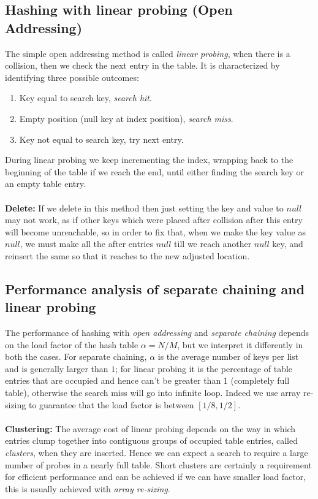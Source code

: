 \documentclass[10pt,a4paper,draft]{article}
\begin{document}
\subsection{Hashing with linear probing (Open Addressing)}
The simple open addressing method is called \emph{linear probing}, when there is a collision, then we check the next entry in the table. It is characterized by identifying three possible outcomes:
\begin{enumerate}
\item Key equal to search key, \emph{search hit}.
\item Empty position (null key at index position), \emph{search miss}.
\item Key not equal to search key, try next entry.
\end{enumerate}
During linear probing we keep incrementing the index, wrapping back to the beginning of the table if we reach the end, until either finding the search key or an empty table entry. 
\\
\\
\textbf{Delete:} If we delete in this method then just setting the key and value to $null$ may not work, as if other keys which were placed after collision after this entry will become unreachable, so in order to fix that, when we make the key value as $null$, we must make all the after entries $null$ till we reach another $null$ key, and reinsert the same so that it reaches to the new adjusted location.
\subsection{Performance analysis of separate chaining and linear probing}
The performance of hashing with \emph{open addressing} and \emph{separate chaining} depends on the load factor of the hash table $\alpha = N/M$, but we interpret it differently in both the cases. For separate chaining, $\alpha$ is the average number of keys per list and is generally larger than $1$; for linear probing it is the percentage of table entries that are occupied and hence can't be greater than $1$ (completely full table), otherwise the search miss will go into infinite loop. Indeed we use array re-sizing to guarantee that the load factor is between $[1/8,1/2]$.
\\
\\
\textbf{Clustering:} The average cost of linear probing depends on the way in which entries clump together into contiguous groups of occupied table entries, called \emph{clusters}, when they are inserted. Hence we can expect a search to require a large number of probes in a nearly full table. Short clusters are certainly a requirement for efficient performance and can be achieved if we can have smaller load factor, this is usually achieved with \emph{array re-sizing}.
\end{document}
